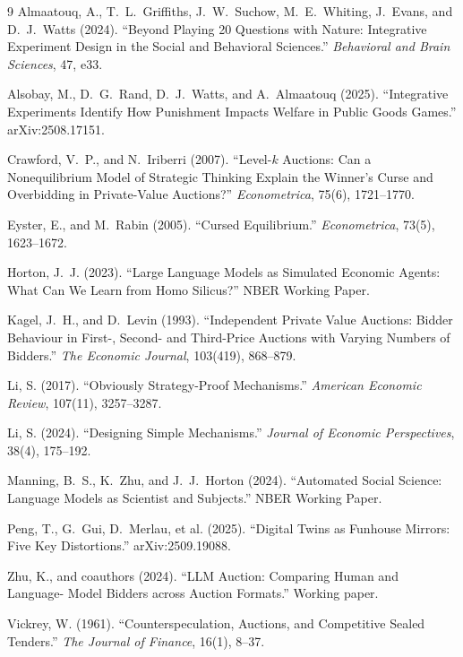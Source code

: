 \documentclass[12pt]{article}
\begin{document}
\begin{thebibliography}{9}
\footnotesize
{}
Almaatouq, A., T.~L.~Griffiths, J.~W.~Suchow, M.~E.~Whiting, J.~Evans,
and D.~J.~Watts (2024). ``Beyond Playing 20 Questions with Nature:
Integrative Experiment Design in the Social and Behavioral
Sciences.'' \textit{Behavioral and Brain Sciences}, 47, e33.

Alsobay, M., D.~G.~Rand, D.~J.~Watts, and A.~Almaatouq (2025).
``Integrative Experiments Identify How Punishment Impacts Welfare in
Public Goods Games.'' arXiv:2508.17151.

Crawford, V.~P., and N.~Iriberri (2007). ``Level-$k$ Auctions: Can a
Nonequilibrium Model of Strategic Thinking Explain the Winner's
Curse and Overbidding in Private-Value Auctions?''
\textit{Econometrica}, 75(6), 1721--1770.

Eyster, E., and M.~Rabin (2005). ``Cursed Equilibrium.''
\textit{Econometrica}, 73(5), 1623--1672.

Horton, J.~J. (2023). ``Large Language Models as Simulated Economic
Agents: What Can We Learn from Homo Silicus?'' NBER Working Paper.

Kagel, J.~H., and D.~Levin (1993). ``Independent Private Value
Auctions: Bidder Behaviour in First-, Second- and Third-Price
Auctions with Varying Numbers of Bidders.''
\textit{The Economic Journal}, 103(419), 868--879.

Li, S. (2017). ``Obviously Strategy-Proof Mechanisms.''
\textit{American Economic Review}, 107(11), 3257--3287.

Li, S. (2024). ``Designing Simple Mechanisms.''
\textit{Journal of Economic Perspectives}, 38(4), 175--192.

Manning, B.~S., K.~Zhu, and J.~J.~Horton (2024). ``Automated Social
Science: Language Models as Scientist and Subjects.'' NBER Working
Paper.

Peng, T., G.~Gui, D.~Merlau, et al. (2025). ``Digital Twins as
Funhouse Mirrors: Five Key Distortions.'' arXiv:2509.19088.

Zhu, K., and coauthors (2024). ``LLM Auction: Comparing Human and Language-
Model Bidders across Auction Formats.'' Working paper.

Vickrey, W. (1961). ``Counterspeculation, Auctions, and Competitive
Sealed Tenders.'' \textit{The Journal of Finance}, 16(1), 8--37.
\end{thebibliography}
\end{document}
